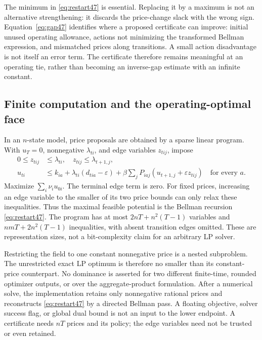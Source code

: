 The minimum in \eqref{eq:restart47} is essential. Replacing it by a maximum is not an alternative strengthening: it discards the price-change slack with the wrong sign. Equation~\eqref{eq:gap47} identifies where a proposed certificate can improve: initial unused operating allowance, actions not minimizing the transformed Bellman expression, and mismatched prices along transitions. A small action disadvantage is not itself an error term. The certificate therefore remains meaningful at an operating tie, rather than becoming an inverse-gap estimate with an infinite constant.

\subsection{Finite computation and the operating-optimal face}
In an $n$-state model, price proposals are obtained by a sparse linear program. With $u_T=0$, nonnegative $\lambda_{ti}$, and edge variables $z_{tij}$, impose
\begin{align}
 0\le z_{tij}&\le\lambda_{ti},\quad z_{tij}\le\lambda_{t+1,j},\label{eq:priceLP47}\\
 u_{ti}&\le k_{ia}+\lambda_{ti}(d_{tia}-\varepsilon)
 +\beta\sum_jP_{iaj}(u_{t+1,j}+\varepsilon z_{tij})\quad\text{for every }a.\nonumber
\end{align}
Maximize $\sum_i\nu_i u_{0i}$. The terminal edge term is zero. For fixed prices, increasing an edge variable to the smaller of its two price bounds can only relax these inequalities. Thus the maximal feasible potential is the Bellman recursion \eqref{eq:restart47}. The program has at most $2nT+n^2(T-1)$ variables and $nmT+2n^2(T-1)$ inequalities, with absent transition edges omitted. These are representation sizes, not a bit-complexity claim for an arbitrary LP solver.

Restricting the field to one constant nonnegative price is a nested subproblem. The unrestricted exact LP optimum is therefore no smaller than its constant-price counterpart. No dominance is asserted for two different finite-time, rounded optimizer outputs, or over the aggregate-product formulation. After a numerical solve, the implementation retains only nonnegative rational prices and reconstructs \eqref{eq:restart47} by a directed Bellman pass. A floating objective, solver success flag, or global dual bound is not an input to the lower endpoint. A certificate needs $nT$ prices and its policy; the edge variables need not be trusted or even retained.

